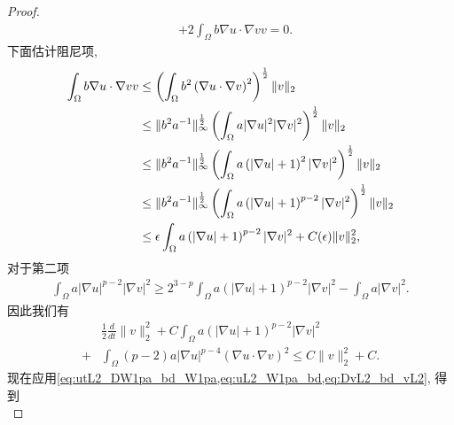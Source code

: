 \documentclass[oneside,longtitle]{LZUthesis}
\numberwithin{equation}{chapter}
\newcommand*\abs[1]{\lvert#1\rvert}
\newcommand*\norm[1]{\lVert#1\rVert}
\begin{document}
\begin{proof}
\begin{equation*}
\begin{split}
			&+ 2\int_{\Omega}b\nabla u \cdot \nabla v v
			= 0.
		\end{split}
	\end{equation*}
	下面估计阻尼项,
	\begin{equation*}
		\begin{split}
			\int_{\Omega}b\nabla u \cdot \nabla v v
			&\leq \left(\int_{\Omega}b^2\left(\nabla u
			\cdot \nabla v\right)^2\right)^{\frac{1}{2}}
			\*\norm{v}_2\\
			&\leq \norm{b^2 a^{-1}}_{\infty}^{\frac{1}{2}}
			\left(\int_{\Omega}a\abs{\nabla u}^2\abs{\nabla v}^2\right)^{\frac{1}{2}}\norm{v}_2\\
			&\leq \norm{b^2 a^{-1}}_{\infty}^{\frac{1}{2}}
			\left(\int_{\Omega}a\left(\abs{\nabla u}+1\right)^2\abs{\nabla v}^2\right)^{\frac{1}{2}}\norm{v}_2\\
			&\leq \norm{b^2 a^{-1}}_{\infty}^{\frac{1}{2}}
			\left(\int_{\Omega}a\left(\abs{\nabla u}+1\right)^{p-2}\abs{\nabla v}^2\right)^{\frac{1}{2}}\norm{v}_2\\
			&\leq \epsilon \int_{\Omega}a\left(\abs{\nabla u}+1\right)^{p-2}\abs{\nabla v}^2
			+ C(\epsilon) \norm{v}_2^2,
		\end{split}
	\end{equation*}
	对于第二项
	\begin{equation*}
		\begin{split}
			\int_{\Omega}a\abs{\nabla u}^{p-2}\abs{\nabla v}^2
			\geq 2^{3-p}\int_{\Omega}a\left(\abs{\nabla u}+1\right)^{p-2}\abs{\nabla v}^2
			- \int_{\Omega}a\abs{\nabla v}^2.
		\end{split}
	\end{equation*}
	因此我们有
	\begin{equation}\label{eq:DvL2_bd_vL2}
		\begin{split}
			& \frac{1}{2}\frac{d}{dt}\norm{v}_2^2
			+ C\int_{\Omega}a\left(\abs{\nabla u}+1\right)^{p-2}\abs{\nabla v}^2\\
			+{} & \int_{\Omega}\left(p-2\right)a\abs{\nabla u}^{p-4}\left(\nabla u
			\cdot \nabla v\right)^2
			\leq C\norm{v}_2^2 + C.
		\end{split}
	\end{equation}
	现在应用\cref{eq:utL2_DW1pa_bd_W1pa,eq:uL2_W1pa_bd,eq:DvL2_bd_vL2},
	得到
	\begin{equation*}

\end{equation*}
\end{proof}
\end{document}
